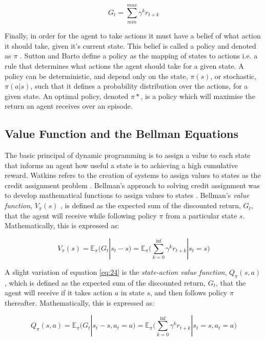 \begin{equation}
	G_t = \sum_{min}^{max}\gamma^k r_{t+k} \label{eq:23}
\end{equation}

Finally, in order for the agent to take actions it must have a belief of what action it should take, given it's current state. This belief is called a policy and denoted as $\pi$ \cite{Sutton2018}. Sutton and Barto define a  policy as the mapping of states to actions i.e. a rule that determines what actions the agent should take for a given state. A policy can be deterministic, and depend only on the state, $\pi(s)$, or stochastic, $\pi(a|s)$, such that it defines a probability distribution over the actions, for a given state. An optimal policy, denoted $\pi*$, is a policy which will maximise the return an agent receives over an episode.


\subsection{Value Function and the Bellman Equations}
The basic principal of dynamic programming is to assign a value to each state that informs an agent how useful a state is to achieving a high cumulative reward. Watkins refers to the creation of systems to assign values to states as the credit assignment problem \cite{Watkin1989}. Bellman's approach to solving credit assignment was to develop mathematical functions to assign values to states \cite{Bellm1954}. Bellman's \textit{value function}, $V_{\pi}(s)$ , is defined as the expected sum of the discounted return, $G_t$, that the agent will receive while following policy $\pi$ from a particular state $s$. Mathematically, this is expressed as:

\begin{equation}
	V_{\pi}(s) = \mathbb{E}_{\pi} \big( G_t | s_t - s \big) = \mathbb{E}_{\pi} \bigg( \sum_{k = 0}^{\inf} \gamma^k r_{t+k} | s_t = s \bigg) \label{eq:24}
\end{equation}

A slight variation of equation \ref{eq:24} is the \textit{state-action value function}, $Q_{\pi}(s,a)$, which is defined as the expected sum of the discounted return, $G_t$, that the agent will receive if it takes action $a$ in state $s$, and then follows policy $\pi$ thereafter. Mathematically, this is expressed as:

\begin{equation}
	Q_{\pi}(s, a) = \mathbb{E}_{\pi} \big( G_t | s_t - s, a_t = a \big) = \mathbb{E}_{\pi} \bigg( \sum_{k = 0}^{\inf} \gamma^k r_{t+k} | s_t = s, a_t = a \bigg) \label{eq:25}
\end{equation}

